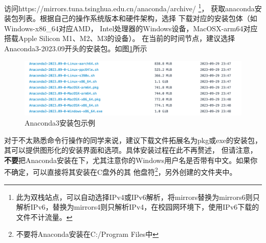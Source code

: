 \documentclass[UTF8]{ctexart}
\begin{document}
访问https://mirrors.tuna.tsinghua.edu.cn/anaconda/archive/ \footnote{此为双栈站点，可以自动选择IPv4或IPv6解析，将mirrors替换为mirrors6则只解析IPv6，替换为mirrors4则只解析IPv4，在校园网环境下，使用IPv6下载的文件不计流量。}，
获取anaconda安装包列表。根据自己的操作系统版本和硬件架构，选择
下载对应的安装包体（如Windows-x86\_64对应AMD，
Intel处理器的Windows设备，MacOSX-arm64对应搭载Apple Silicon M1、M2、M3的设备）。
在当前的时间节点，建议选择Anaconda3-2023.09开头的安装包。如图\ref{fig:anacondaSelection}所示
\begin{figure}[htbp]
    \centering
    \includegraphics*[width=0.8\linewidth]{pic/tuna_anacondaDownload.png}
    \caption{Anaconda3安装包示例}
    \label{fig:anacondaSelection}
\end{figure}

对于不太熟悉命令行操作的同学来说，建议下载文件拓展名为pkg或exe的安装包，其可以提供图形化的安装界面和选项。具体安装过程在此不再赘述，
但请注意，\textbf{不要}把Anaconda安装在下，尤其注意你的Windows用户名是否带有中文。如果你不确定，可以直接将其安装在C盘外的其
他盘符\footnote{不要将Anaconda安装在C:/Program Files中}，另外创建的文件夹中。
\end{document}
